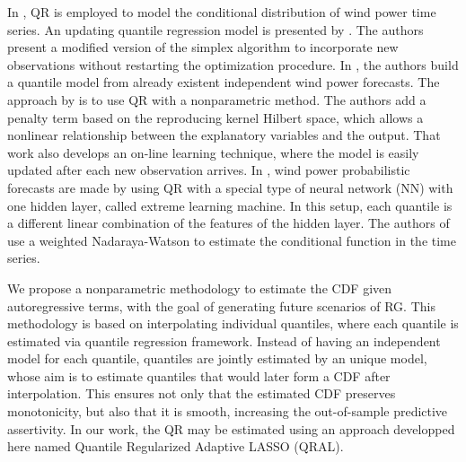 %






In \cite{gallego2016line,moller_time-adaptive_2008,nielsen2006,bremnes_probabilistic_2004,wan_direct_2017}, QR is employed to model the conditional distribution of wind power time series.
An updating quantile regression model is presented by \cite{moller_time-adaptive_2008}. The authors present a modified version of the simplex algorithm to incorporate new observations without restarting the optimization procedure.
In \cite{nielsen2006}, the authors build a quantile model from already existent independent wind power forecasts.
The approach by \cite{gallego2016line} is to use QR with a nonparametric method. The authors add a penalty term based on the reproducing kernel Hilbert space, which allows a nonlinear relationship between the explanatory variables and the output. That work also develops an on-line learning technique, where the model is easily updated after each new observation arrives.
In \cite{wan_direct_2017}, wind power probabilistic forecasts are made by using QR with a special type of neural network (NN) with one hidden layer, called extreme learning machine. In this setup, each quantile is a different linear combination of the features of the hidden layer.
The authors of \cite{cai_regression_2002} use a weighted Nadaraya-Watson to estimate the conditional function in the time series.


We propose a nonparametric methodology to estimate the CDF given autoregressive terms, with the goal of generating future scenarios of RG. This methodology is based on interpolating individual quantiles, where each quantile is estimated via quantile regression framework.
Instead of having an independent model for each quantile, quantiles are jointly estimated by an unique model, whose aim is to estimate quantiles that would later form a CDF after interpolation. This ensures not only that the estimated CDF preserves monotonicity, but also that it is smooth, increasing the out-of-sample predictive assertivity.
In our work, the QR may be estimated using an approach developped here  named Quantile Regularized Adaptive LASSO (QRAL).


